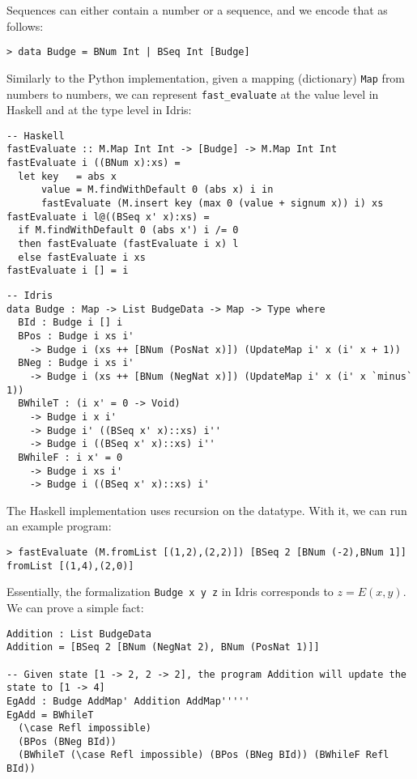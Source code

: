 \documentclass{article}
\begin{document}
\pagebreak

Sequences can either contain a number or a sequence, and we encode that as follows:

\begin{lstlisting}
> data Budge = BNum Int | BSeq Int [Budge]
\end{lstlisting}

Similarly to the Python implementation, given a mapping (dictionary) \texttt{Map} from numbers to numbers, we can represent \texttt{fast\_evaluate} at the value level in Haskell and at the type level in Idris:

\begin{minipage}[t]{0.49\textwidth}
\begin{lstlisting}
-- Haskell
fastEvaluate :: M.Map Int Int -> [Budge] -> M.Map Int Int
fastEvaluate i ((BNum x):xs) =
  let key   = abs x
      value = M.findWithDefault 0 (abs x) i in
      fastEvaluate (M.insert key (max 0 (value + signum x)) i) xs
fastEvaluate i l@((BSeq x' x):xs) =
  if M.findWithDefault 0 (abs x') i /= 0
  then fastEvaluate (fastEvaluate i x) l
  else fastEvaluate i xs
fastEvaluate i [] = i
\end{lstlisting}
\end{minipage}
\begin{minipage}[t]{0.49\textwidth}
\begin{lstlisting}
-- Idris
data Budge : Map -> List BudgeData -> Map -> Type where
  BId : Budge i [] i
  BPos : Budge i xs i'
    -> Budge i (xs ++ [BNum (PosNat x)]) (UpdateMap i' x (i' x + 1))
  BNeg : Budge i xs i'
    -> Budge i (xs ++ [BNum (NegNat x)]) (UpdateMap i' x (i' x `minus` 1))
  BWhileT : (i x' = 0 -> Void)
    -> Budge i x i'
    -> Budge i' ((BSeq x' x)::xs) i''
    -> Budge i ((BSeq x' x)::xs) i''
  BWhileF : i x' = 0
    -> Budge i xs i'
    -> Budge i ((BSeq x' x)::xs) i'
\end{lstlisting}
\end{minipage}

The Haskell implementation uses recursion on the datatype. With it, we can run an example program:

\begin{verbatim}
> fastEvaluate (M.fromList [(1,2),(2,2)]) [BSeq 2 [BNum (-2),BNum 1]]
fromList [(1,4),(2,0)]
\end{verbatim}

Essentially, the formalization \texttt{Budge x y z} in Idris corresponds to $z = E(x, y)$. We can prove a simple fact:

\begin{lstlisting}
Addition : List BudgeData
Addition = [BSeq 2 [BNum (NegNat 2), BNum (PosNat 1)]]

-- Given state [1 -> 2, 2 -> 2], the program Addition will update the state to [1 -> 4]
EgAdd : Budge AddMap' Addition AddMap'''''
EgAdd = BWhileT
  (\case Refl impossible)
  (BPos (BNeg BId))
  (BWhileT (\case Refl impossible) (BPos (BNeg BId)) (BWhileF Refl BId))
\end{lstlisting}
\end{document}
